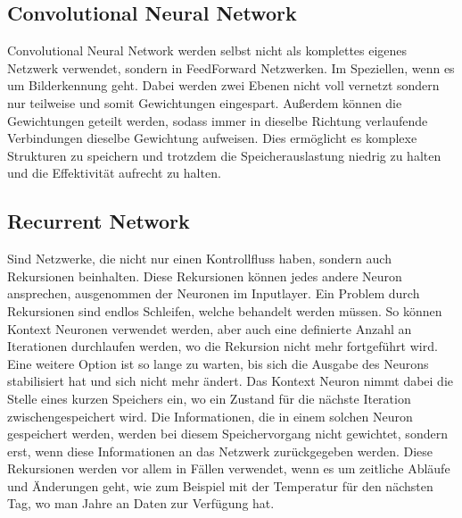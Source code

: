 
\subsection{Convolutional Neural Network}

Convolutional Neural Network werden selbst nicht als komplettes eigenes Netzwerk verwendet, sondern in FeedForward Netzwerken.
Im Speziellen, wenn es um Bilderkennung geht.
Dabei werden zwei Ebenen nicht voll vernetzt sondern nur teilweise und somit Gewichtungen eingespart.
Außerdem können die Gewichtungen geteilt werden, sodass immer in dieselbe Richtung verlaufende Verbindungen dieselbe Gewichtung aufweisen.
Dies ermöglicht es komplexe Strukturen zu speichern und trotzdem die Speicherauslastung niedrig zu halten und die Effektivität aufrecht zu halten.


\subsection{Recurrent Network}

Sind Netzwerke, die nicht nur einen Kontrollfluss haben, sondern auch Rekursionen beinhalten. 
Diese Rekursionen können jedes andere Neuron ansprechen, ausgenommen der Neuronen im Inputlayer.
Ein Problem durch Rekursionen sind endlos Schleifen, welche behandelt werden müssen.
So können Kontext Neuronen verwendet werden, aber auch eine definierte Anzahl an Iterationen durchlaufen werden, wo die Rekursion nicht mehr fortgeführt wird. 
Eine weitere Option ist so lange zu warten, bis sich die Ausgabe des Neurons stabilisiert hat und sich nicht mehr ändert.
Das Kontext Neuron nimmt dabei die Stelle eines kurzen Speichers ein, wo ein Zustand für die nächste Iteration zwischengespeichert wird.
Die Informationen, die in einem solchen Neuron gespeichert werden, werden bei diesem Speichervorgang nicht gewichtet, sondern erst, wenn diese Informationen an das Netzwerk zurückgegeben werden.
Diese Rekursionen werden vor allem in Fällen verwendet, wenn es um zeitliche Abläufe und Änderungen geht, wie zum Beispiel mit der Temperatur für den nächsten Tag, wo man Jahre an Daten zur Verfügung hat.

